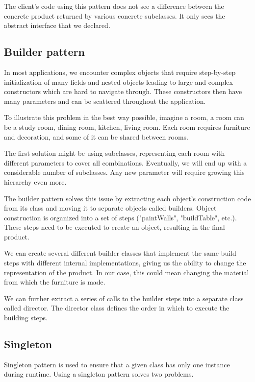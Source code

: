 The client's code using this pattern does not see a difference between the concrete product returned by various concrete subclasses.
It only sees the abstract interface that we declared.

\subsection{Builder pattern}

In most applications, we encounter complex objects that require step-by-step initialization of many fields and nested objects leading to large and complex constructors which are hard to navigate through. These constructors then have many parameters and can be scattered throughout the application.

To illustrate this problem in the best way possible, imagine a room, a room can be a study room, dining room, kitchen, living room. Each room requires furniture and decoration, and some of it can be shared between rooms.

The first solution might be using subclasses, representing each room with different parameters to cover all combinations. Eventually, we will end up with a considerable number of subclasses. Any new parameter will require growing this hierarchy even more.

The builder pattern solves this issue by extracting each object's construction code from its class and moving it to separate objects called builders. Object construction is organized into a set of steps ("paintWalls", "buildTable", etc.). These steps need to be executed to create an object, resulting in the final product.

We can create several different builder classes that implement the same build steps with different internal implementations, giving us the ability to change the representation of the product. In our case, this could mean changing the material from which the furniture is made.

We can further extract a series of calls to the builder steps into a separate class called director. The director class defines the order in which to execute the building steps. \cite{noauthor_factory_nodate}

\subsection{Singleton}

Singleton pattern is used to ensure that a given class has only one instance during runtime. Using a singleton pattern solves two problems.

